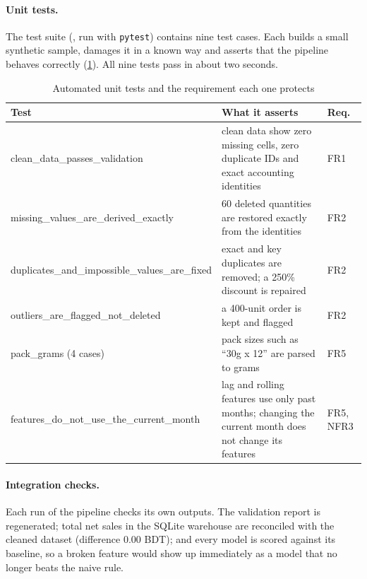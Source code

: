 \paragraph{Unit tests.} The test suite (, run with \texttt{pytest}) contains nine
test cases. Each builds a small synthetic sample, damages it in a known way and asserts that the pipeline
behaves correctly (\cref{tab:tests-unit}). All nine tests pass in about two seconds.

\begin{table}[htbp]\centering\small
\caption{Automated unit tests and the requirement each one protects}\label{tab:tests-unit}
\begin{tabularx}{\linewidth}{@{}>{\raggedright\arraybackslash\footnotesize\ttfamily}p{4.3cm}Xl@{}}
\toprule
\normalfont\small\textbf{Test} & \textbf{What it asserts} & \textbf{Req.} \\ \midrule
clean\_data\_\allowbreak passes\_validation & clean data show zero missing cells, zero duplicate IDs and exact accounting identities & FR1 \\
missing\_values\_\allowbreak are\_derived\_exactly & 60 deleted quantities are restored exactly from the identities & FR2 \\
duplicates\_and\_\allowbreak impossible\_values\_\allowbreak are\_fixed & exact and key duplicates are removed; a 250\% discount is repaired & FR2 \\
outliers\_are\_\allowbreak flagged\_not\_deleted & a 400-unit order is kept and flagged & FR2 \\
pack\_grams (4 cases) & pack sizes such as ``30g x 12'' are parsed to grams & FR5 \\
features\_do\_not\_\allowbreak use\_the\_current\_month & lag and rolling features use only past months; changing the current month does not change its features & FR5, NFR3 \\ \bottomrule
\end{tabularx}
\end{table}

\paragraph{Integration checks.} Each run of the pipeline checks its own outputs. The validation report is
regenerated; total net sales in the SQLite warehouse are reconciled with the cleaned dataset (difference
0.00 BDT); and every model is scored against its baseline, so a broken feature would show up immediately as a
model that no longer beats the naive rule.

